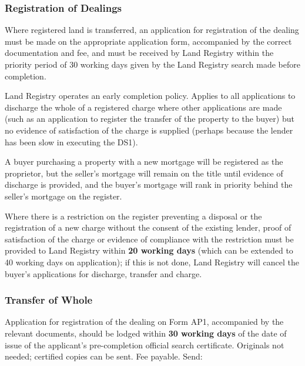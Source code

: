\documentclass[
]{article}
\newenvironment{Shaded}{}{}
\newcommand{\NormalTok}[1]{#1}
\begin{document}
\hypertarget{registration-of-dealings}{%
\subsubsection{Registration of
Dealings}\label{registration-of-dealings}}

Where registered land is transferred, an application for registration of
the dealing must be made on the appropriate application form,
accompanied by the correct documentation and fee, and must be received
by Land Registry within the priority period of 30 working days given by
the Land Registry search made before completion.

Land Registry operates an early completion policy. Applies to all
applications to discharge the whole of a registered charge where other
applications are made (such as an application to register the transfer
of the property to the buyer) but no evidence of satisfaction of the
charge is supplied (perhaps because the lender has been slow in
executing the DS1).

\begin{Shaded}
\begin{Highlighting}[]
\NormalTok{A buyer purchasing a property with a new mortgage will be registered as the proprietor, but the seller’s mortgage will remain on the title until evidence of discharge is provided, and the buyer’s mortgage will rank in priority behind the seller’s mortgage on the register.}
\end{Highlighting}
\end{Shaded}

Where there is a restriction on the register preventing a disposal or
the registration of a new charge without the consent of the existing
lender, proof of satisfaction of the charge or evidence of compliance
with the restriction must be provided to Land Registry within \textbf{20
working days} (which can be extended to 40 working days on application);
if this is not done, Land Registry will cancel the buyer's applications
for discharge, transfer and charge.

\hypertarget{transfer-of-whole}{%
\subsubsection{Transfer of Whole}\label{transfer-of-whole}}

Application for registration of the dealing on Form AP1, accompanied by
the relevant documents, should be lodged within \textbf{30 working days}
of the date of issue of the applicant's pre-completion official search
certificate. Originals not needed; certified copies can be sent. Fee
payable. Send:
\end{document}
